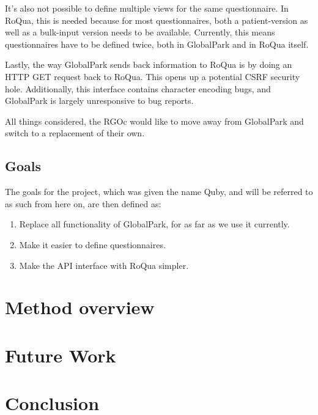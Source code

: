 \documentclass[10pt,fleqn,a4paper]{article}
\begin{document}
\begin{twocolumn}
It's also not possible to define multiple views for the same
questionnaire. In RoQua, this is needed because for most
questionnaires, both a patient-version as well as a bulk-input version
needs to be available. Currently, this means questionnaires have to be
defined twice, both in GlobalPark and in RoQua itself.

Lastly, the way GlobalPark sends back information to RoQua is by doing
an HTTP GET request back to RoQua. This opens up a potential CSRF
security hole. Additionally, this interface contains character
encoding bugs, and GlobalPark is largely unresponsive to bug reports.

All things considered, the RGOc would like to move away from
GlobalPark and switch to a replacement of their own.

\subsection{Goals}

The goals for the project, which was given the name Quby, and will be
referred to as such from here on, are then defined as:

\begin{enumerate}
\item Replace all functionality of GlobalPark, for as far as we use it
  currently.
\item \label{dsl} Make it easier to define questionnaires.
\item \label{restful} Make the API interface with RoQua simpler.
\end{enumerate}

\section{Method overview}



\section{Future Work}

\section{Conclusion}

%
%
\end{twocolumn}
\end{document}

